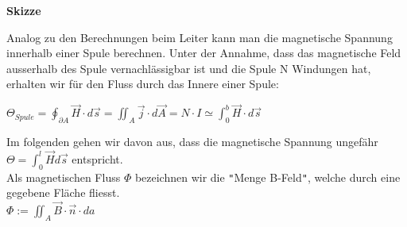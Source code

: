	\textbf{Skizze}
	\begin{center}
	\end{center}
	\iend


	\beginip
	Analog zu den Berechnungen beim Leiter kann man die magnetische Spannung innerhalb einer Spule berechnen. Unter der Annahme, dass das magnetische Feld ausserhalb des Spule vernachlässigbar ist
	und die Spule N Windungen hat, erhalten wir für den Fluss durch das Innere einer Spule:

	\formulaBegin
	$\displaystyle \Theta_{Spule} = \oint_{\partial A} \vec{H} \cdot d\vec{s} = \iint_{A} \vec{j} \cdot d\vec{A} = N \cdot I \simeq \int_0^b \vec{H} \cdot d\vec{s}$
	\formulaEnd
	\begin{center}
	\end{center}
	\iend

	Im folgenden gehen wir davon aus, dass die magnetische Spannung ungefähr $ \Theta = \int_0^l \vec{H} d\vec{s}$ entspricht.\\
	\beginip
		Als magnetischen Fluss $\Phi$ bezeichnen wir die \texttt{"}Menge B-Feld\texttt{"}, welche durch eine gegebene Fläche fliesst. \\
		\formulaBegin
		$\displaystyle \Phi := \iint_A \vec{B} \cdot \vec{n} \cdot da$
		\formulaEnd
	\iend


